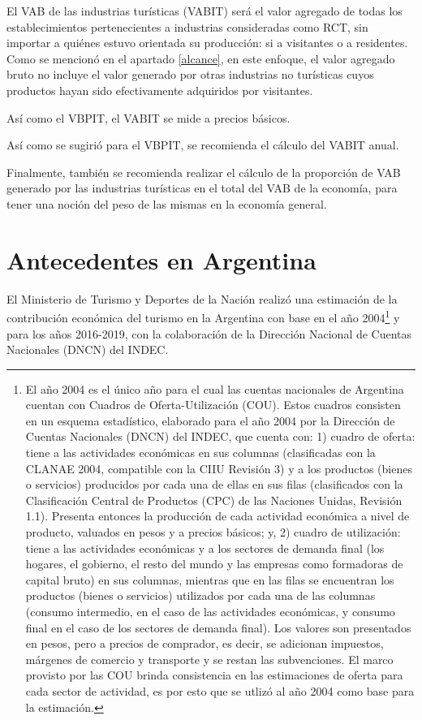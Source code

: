\documentclass[
  openany]{book}
\begin{document}
El VAB de las industrias turísticas (VABIT) será el valor agregado de todas los establecimientos pertenecientes a industrias consideradas como RCT, sin importar a quiénes estuvo orientada su producción: si a visitantes o a residentes. Como se mencionó en el apartado \ref{alcance}, en este enfoque, el valor agregado bruto no incluye el valor generado por otras industrias no turísticas cuyos productos hayan sido efectivamente adquiridos por visitantes.

Así como el VBPIT, el VABIT se mide a precios básicos.

Así como se sugirió para el VBPIT, se recomienda el cálculo del VABIT anual.

Finalmente, también se recomienda realizar el cálculo de la proporción de VAB generado por las industrias turísticas en el total del VAB de la economía, para tener una noción del peso de las mismas en la economía general.

\hypertarget{antecedentes-en-argentina}{%
\section{Antecedentes en Argentina}\label{antecedentes-en-argentina}}

El Ministerio de Turismo y Deportes de la Nación realizó una estimación de la contribución económica del turismo en la Argentina con base en el año 2004\footnote{El año 2004 es el único año para el cual las cuentas nacionales de Argentina cuentan con Cuadros de Oferta-Utilización (COU). Estos cuadros consisten en un esquema estadístico, elaborado para el año 2004 por la Dirección de Cuentas Nacionales (DNCN) del INDEC, que cuenta con: 1) cuadro de oferta: tiene a las actividades económicas en sus columnas (clasificadas con la CLANAE 2004, compatible con la CIIU Revisión 3) y a los productos (bienes o servicios) producidos por cada una de ellas en sus filas (clasificados con la Clasificación Central de Productos (CPC) de las Naciones Unidas, Revisión 1.1). Presenta entonces la producción de cada actividad económica a nivel de producto, valuados en pesos y a precios básicos; y, 2) cuadro de utilización: tiene a las actividades económicas y a los sectores de demanda final (los hogares, el gobierno, el resto del mundo y las empresas como formadoras de capital bruto) en sus columnas, mientras que en las filas se encuentran los productos (bienes o servicios) utilizados por cada una de las columnas (consumo intermedio, en el caso de las actividades económicas, y consumo final en el caso de los sectores de demanda final). Los valores son presentados en pesos, pero a precios de comprador, es decir, se adicionan impuestos, márgenes de comercio y transporte y se restan las subvenciones. El marco provisto por las COU brinda consistencia en las estimaciones de oferta para cada sector de actividad, es por esto que se utlizó al año 2004 como base para la estimación.} y para los años 2016-2019, con la colaboración de la Dirección Nacional de Cuentas Nacionales (DNCN) del INDEC.
\end{document}

